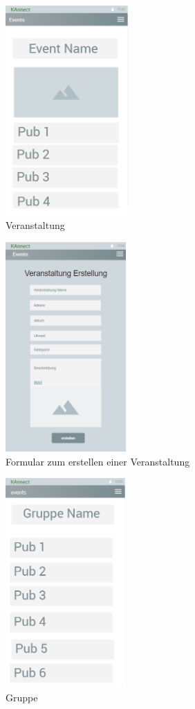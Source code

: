 \documentclass[parskip=full]{scrartcl}
\begin{document}
	\begin{figure}[H]
		\centering
		\includegraphics[height=8cm]{Event}
		\caption{Veranstaltung}
		\label{Veranstaltung}
	\end{figure}
	
	
	\begin{figure}[H]
		\centering
		\includegraphics[height=8cm]{FormularVeranstaltung}
		\caption{Formular zum erstellen einer Veranstaltung}
		\label{FormularVeranstaltung}
	\end{figure}
	
	
	\begin{figure}[H]
		\centering
		\includegraphics[height=8cm]{Group}
		\caption{Gruppe}
		\label{Gruppe}
	\end{figure}
	
\end{document}
